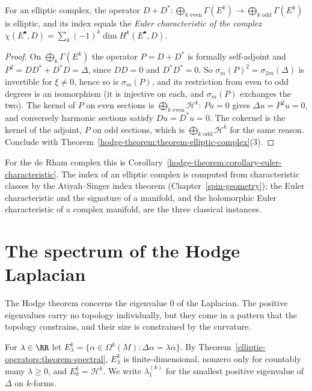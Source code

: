 \begin{corollary}\label{hodge-theorem:corollary-euler-characteristic-complex}
For an elliptic complex, the operator $D + D^* \colon \bigoplus_{k \text{ even}}\Gamma(E^k) \to \bigoplus_{k \text{ odd}}\Gamma(E^k)$ is elliptic, and its index equals the \emph{Euler characteristic of the complex}
$\chi(E^\bullet, D) = \sum_k(-1)^k\dim H^k(E^\bullet, D)$.
\end{corollary}

\begin{proof}
On $\bigoplus_k\Gamma(E^k)$ the operator $P = D + D^*$ is formally self-adjoint and $P^2 = DD^* + D^*D = \Delta$, since $DD = 0$ and $D^*D^* = 0$. So $\sigma_m(P)^2 = \sigma_{2m}(\Delta)$ is invertible for $\xi \neq 0$, hence
so is $\sigma_m(P)$, and its restriction from even to odd degrees is an isomorphism (it is injective on each, and $\sigma_m(P)$ exchanges the two). The kernel of $P$ on even sections is
$\bigoplus_{k \text{ even}}\mathcal{H}^k$: $Pu = 0$ gives $\Delta u = P^2u = 0$, and conversely harmonic sections satisfy $Du = D^*u = 0$. The cokernel is the kernel of the adjoint, $P$ on odd sections, which is
$\bigoplus_{k \text{ odd}}\mathcal{H}^k$ for the same reason. Conclude with Theorem~\ref{hodge-theorem:theorem-elliptic-complex}(3).
\end{proof}

For the de Rham complex this is Corollary~\ref{hodge-theorem:corollary-euler-characteristic}. The index of an elliptic complex is computed from characteristic classes by the Atiyah--Singer index theorem
(Chapter~\ref{spin-geometry}); the Euler characteristic and the signature of a manifold, and the holomorphic Euler characteristic of a complex manifold, are the three classical instances.

\section{The spectrum of the Hodge Laplacian}\label{hodge-theorem:section-spectrum}

The Hodge theorem concerns the eigenvalue $0$ of the Laplacian. The positive eigenvalues carry no topology individually, but they come in a pattern that the topology constrains, and their size is constrained by the
curvature.

\begin{notation}\label{hodge-theorem:notation-eigenspaces}
For $\lambda \in \RR$ let $E^k_\lambda = \{\alpha \in \Omega^k(M) : \Delta\alpha = \lambda\alpha\}$. By Theorem~\ref{elliptic-operators:theorem-spectral}, $E^k_\lambda$ is finite-dimensional, nonzero only for countably many
$\lambda \geq 0$, and $E^k_0 = \mathcal{H}^k$. We write $\lambda_1^{(k)}$ for the smallest positive eigenvalue of $\Delta$ on $k$-forms.
\end{notation}

